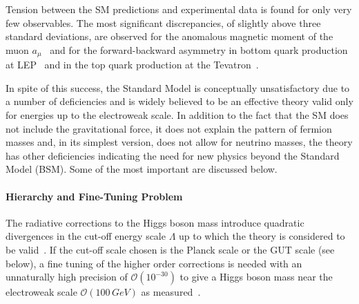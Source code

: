 Tension between the SM predictions and  experimental data is found for only very few observables. 
The most significant discrepancies, of slightly above three standard deviations, are observed for the anomalous magnetic moment 
of the muon $a_{\mu}$~\cite{gminus2} and for the forward-backward asymmetry in bottom quark production at LEP~\cite{smtest}
and in the top quark production at the Tevatron~\cite{FBasymmetry}.   


In spite of this success, the Standard Model is conceptually unsatisfactory due to a number of deficiencies and is
widely believed to be an effective theory valid only for energies up to the electroweak scale. In addition to the fact that 
the SM does not  include the  gravitational force, it does not explain the pattern of fermion masses and, in its simplest 
version, does not allow for neutrino masses, the theory has other deficiencies indicating the need 
for new physics beyond the Standard Model (BSM). Some of the most important are discussed below.
\paragraph{Hierarchy and Fine-Tuning Problem} The radiative corrections to the Higgs boson mass introduce quadratic divergences in  
	the cut-off energy scale $\Lambda$ up to which the theory is considered to be valid~\cite{Lambda}.
	If the cut-off scale chosen is the Planck scale or the GUT scale (see below), a fine tuning of the 
	higher order corrections is needed with an unnaturally high precision of $\mathcal{O}(10^{-30})$ 
	to give a  Higgs boson mass near the electroweak scale $\mathcal{O}(100\,GeV)$ as measured~\cite{Hierarchy1,Hierarchy2,Hierarchy3}.


